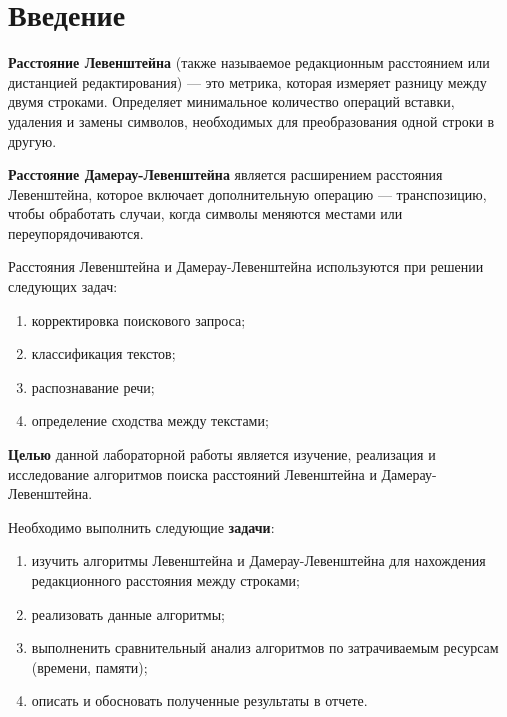 \chapter*{Введение}

\textbf{Расстояние Левенштейна} (также называемое редакционным рас\-стоянием
или дистанцией редактирования) --- это метрика, которая измеря\-ет разницу
между двумя строками. Определяет минимальное количество опе\-раций 
вставки, удаления и замены символов, необходимых для преобра\-зования
одной строки в другую.

\textbf{Расстояние Дамерау-Левенштейна} является расширением рас\-стояния 
Левенштейна, которое включает дополнительную операцию --- транспозицию,
чтобы обработать случаи, когда символы меняются местами или
переу\-порядочиваются.

Расстояния Левенштейна и Дамерау-Левенштейна используются
при решении следующих задач:
\begin{enumerate}
    \item корректировка поискового запроса;
    \item классификация текстов;
    \item распознавание речи;
    \item определение сходства между текстами;
\end{enumerate}

\textbf{Целью} данной лабораторной работы является изучение, 
реализация и исследование алгоритмов поиска расстояний Левенштейна 
и Дамерау-Левенштейна.

Необходимо выполнить следующие \textbf{задачи}:
\begin{enumerate}[]
    \item изучить алгоритмы Левенштейна и Дамерау-Левенштейна для 
    нахождения редакционного расстояния между строками;
    \item реализовать данные алгоритмы;
    \item выполненить сравнительный анализ алгоритмов по затрачиваемым ресурсам (времени, памяти);
    \item описать и обосновать полученные результаты в отчете.
\end{enumerate}